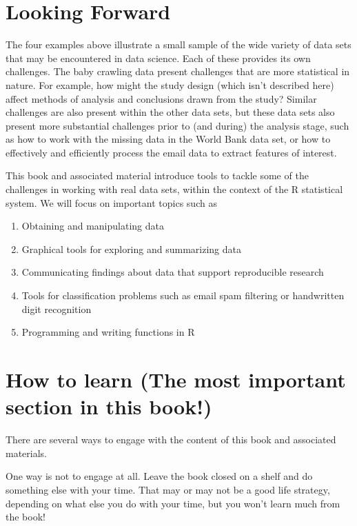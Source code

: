 \documentclass[
]{krantz}
\providecommand{\tightlist}{%
  \setlength{\itemsep}{0pt}\setlength{\parskip}{0pt}}
\begin{document}
\hypertarget{looking-forward}{%
\section{Looking Forward}\label{looking-forward}}

The four examples above illustrate a small sample of the wide variety of data sets that may be encountered in data science. Each of these provides its own challenges. The baby crawling data present challenges that are more statistical in nature. For example, how might the study design (which isn't described here) affect methods of analysis and conclusions drawn from the study? Similar challenges are also present within the other data sets, but these data sets also present more substantial challenges prior to (and during) the analysis stage, such as how to work with the missing data in the World Bank data set, or how to effectively and efficiently process the email data to extract features of interest.

This book and associated material introduce tools to tackle some of the challenges in working with real data sets, within the context of the R statistical system. We will focus on important topics such as

\begin{enumerate}
\def\labelenumi{\arabic{enumi}.}
\tightlist
\item
  Obtaining and manipulating data
\item
  Graphical tools for exploring and summarizing data
\item
  Communicating findings about data that support reproducible research
\item
  Tools for classification problems such as email spam filtering or handwritten digit recognition
\item
  Programming and writing functions in R
\end{enumerate}

\hypertarget{how-to-learn-the-most-important-section-in-this-book}{%
\section{How to learn (The most important section in this book!)}\label{how-to-learn-the-most-important-section-in-this-book}}

There are several ways to engage with the content of this book and associated materials.

One way is not to engage at all. Leave the book closed on a shelf and do something else with your time. That may or may not be a good life strategy, depending on what else you do with your time, but you won't learn much from the book!
\end{document}
